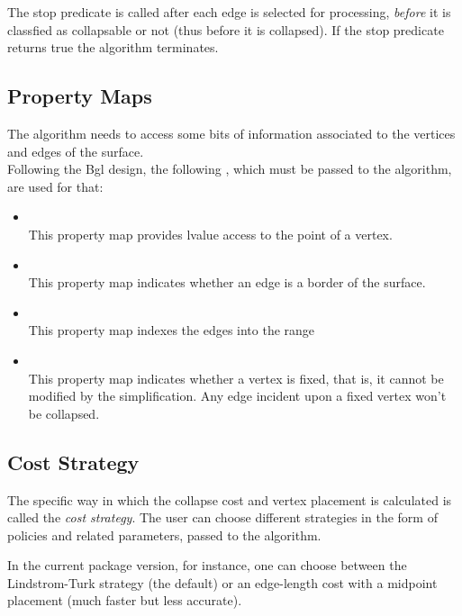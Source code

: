 The stop predicate is called after each edge is selected for processing, {\em before} it is classfied as collapsable or not (thus before it is collapsed). If the stop predicate returns true the algorithm terminates.

\subsection{Property Maps}

The algorithm needs to access some bits of information associated to the vertices and edges of the surface.\\ Following the {\sc Bgl} design, the following
, 
which must be passed to the algorithm, are used for that:

\begin{itemize}

\item {}\\
This property map provides lvalue access to the point of a vertex.

\item {}\\
This property map indicates whether an edge is a border of the surface.

\item {}\\
This property map indexes the edges into the range

\item {}\\
This property map indicates whether a vertex is fixed, that is, it cannot be modified by the
simplification. Any edge incident upon a fixed vertex won't be collapsed.

\end{itemize}

\subsection{Cost Strategy}

The specific way in which the collapse cost and vertex placement is
calculated is called the {\em cost strategy}. The user can choose 
different strategies in the form of policies and related parameters,
passed to the algorithm.
 
In the current package version, for instance,
one can choose between the Lindstrom-Turk strategy 
(the default) or an edge-length cost with a midpoint 
placement (much faster but less accurate).

